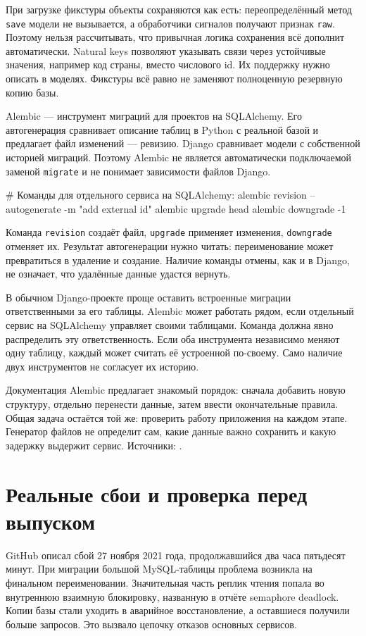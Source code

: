 \documentclass[11pt,a4paper]{article}
\newcommand{\src}[1]{{\small\color{muted}Источники: #1.}}
\newcommand{\parthead}[1]{\Needspace{10\baselineskip}\section{#1}}
\begin{document}
При загрузке фикстуры объекты сохраняются как есть: переопределённый метод \texttt{save} модели не вызывается, а обработчики сигналов получают признак \texttt{raw}. Поэтому нельзя рассчитывать, что привычная логика сохранения всё дополнит автоматически. Natural keys позволяют указывать связи через устойчивые значения, например код страны, вместо числового id. Их поддержку нужно описать в моделях. Фикстуры всё равно не заменяют полноценную резервную копию базы.

Alembic --- инструмент миграций для проектов на SQLAlchemy. Его автогенерация сравнивает описание таблиц в Python с реальной базой и предлагает файл изменений --- ревизию. Django сравнивает модели с собственной историей миграций. Поэтому Alembic не является автоматически подключаемой заменой \texttt{migrate} и не понимает зависимости файлов Django.
\begin{code}
# Команды для отдельного сервиса на SQLAlchemy:
alembic revision --autogenerate -m "add external id"
alembic upgrade head
alembic downgrade -1
\end{code}
Команда \texttt{revision} создаёт файл, \texttt{upgrade} применяет изменения, \texttt{downgrade} отменяет их. Результат автогенерации нужно читать: переименование может превратиться в удаление и создание. Наличие команды отмены, как и в Django, не означает, что удалённые данные удастся вернуть.

В обычном Django-проекте проще оставить встроенные миграции ответственными за его таблицы. Alembic может работать рядом, если отдельный сервис на SQLAlchemy управляет своими таблицами. Команда должна явно распределить эту ответственность. Если оба инструмента независимо меняют одну таблицу, каждый может считать её устроенной по-своему. Само наличие двух инструментов не согласует их историю.

Документация Alembic предлагает знакомый порядок: сначала добавить новую структуру, отдельно перенести данные, затем ввести окончательные правила. Общая задача остаётся той же: проверить работу приложения на каждом этапе. Генератор файлов не определит сам, какие данные важно сохранить и какую задержку выдержит сервис.
\src{\cite{fixtures,initial,serialization,alembicauto,alembiccookbook}}

\parthead{Реальные сбои и проверка перед выпуском}

GitHub описал сбой 27 ноября 2021 года, продолжавшийся два часа пятьдесят минут. При миграции большой MySQL-таблицы проблема возникла на финальном переименовании. Значительная часть реплик чтения попала во внутреннюю взаимную блокировку, названную в отчёте semaphore deadlock. Копии базы стали уходить в аварийное восстановление, а оставшиеся получили больше запросов. Это вызвало цепочку отказов основных сервисов.
\end{document}
